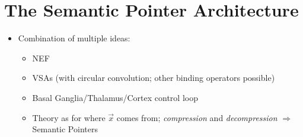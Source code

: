\documentclass[10pt,letterpaper,oneside]{article}
\begin{document}
\section{The Semantic Pointer Architecture}

\begin{itemize}
	\item Combination of multiple ideas:
	\begin{itemize}
		\item NEF
		\item VSAs (with circular convolution; other binding operators possible)
		\item Basal Ganglia/Thalamus/Cortex control loop
		\item Theory as for where $\vec x$ comes from; \emph{compression} and \emph{decompression} $\Rightarrow$ Semantic Pointers
	\end{itemize}
\end{itemize}

\printbibliography
\end{document}
